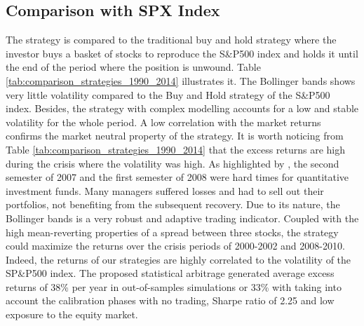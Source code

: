 \documentclass[11pt,a4,twosided,singlespacing,titlepagenumber=on]{scrreprt}
\numberwithin{equation}{chapter} %
\theoremstyle{remark}
\begin{document}
\subsection{Comparison with SPX Index}

The strategy is compared to the traditional buy and hold strategy where the investor buys a basket of stocks to reproduce the S\&P500 index and holds it until the end of the period where the position is unwound. Table \ref{tab:comparison_strategies_1990_2014} illustrates it. The Bollinger bands shows very little volatility compared to the Buy and Hold strategy of the S\&P500 index. Besides, the strategy with complex modelling accounts for a low and stable volatility for the whole period. A low correlation with the market returns confirms the market neutral property of the strategy. It is worth noticing from Table \ref{tab:comparison_strategies_1990_2014} that the excess returns are high during the crisis where the volatility was high. As highlighted by \cite{khandani2007}, the second semester of 2007 and the first semester of 2008 were hard times for quantitative investment funds. Many managers suffered losses and had to sell out their portfolios, not benefiting from the subsequent recovery. Due to its nature, the Bollinger bands is a very robust and adaptive trading indicator. Coupled with the high mean-reverting properties of a spread between three stocks, the strategy could maximize the returns over the crisis periods of 2000-2002 and 2008-2010. Indeed, the returns of our strategies are highly correlated to the volatility of the SP\&P500 index. The proposed statistical arbitrage generated average excess returns of 38\% per year in out-of-samples simulations or 33\% with taking into account the calibration phases with no trading, Sharpe ratio of 2.25 and low exposure to the equity market.
\end{document}
